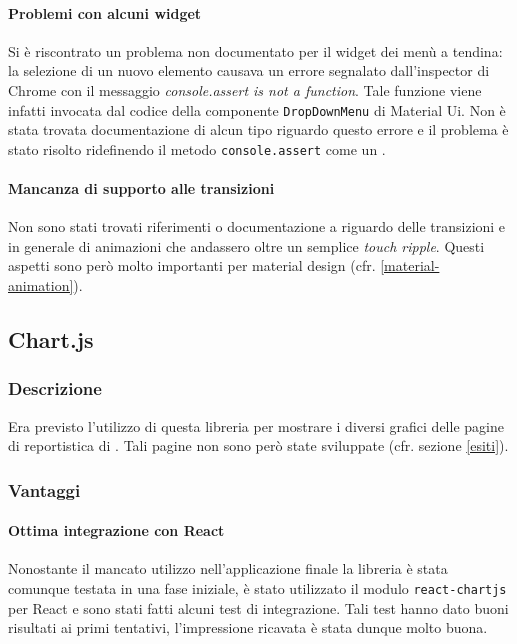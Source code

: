 \paragraph{Problemi con alcuni widget}
Si è riscontrato un problema non documentato
per il widget dei menù a tendina: la selezione di un nuovo elemento causava un errore
segnalato dall'inspector di Chrome con il messaggio \textit{console.assert
is not a function}. Tale funzione viene infatti invocata dal codice della componente
\texttt{DropDownMenu} di Material Ui. Non è stata trovata documentazione di alcun tipo
riguardo questo errore e il problema è stato risolto ridefinendo il metodo
\texttt{console.assert} come un .

\paragraph{Mancanza di supporto alle transizioni}
Non sono stati trovati riferimenti
o documentazione a riguardo delle transizioni e in generale di animazioni che andassero
oltre un semplice \textit{touch ripple}. Questi aspetti sono però molto importanti per
material design (cfr. \ref{material-animation}).

\subsection{Chart.js}

\subsubsection{Descrizione}
Era previsto l'utilizzo di questa libreria per mostrare i diversi grafici delle pagine
di reportistica di \fiscoloMobile{}. Tali pagine non sono però state sviluppate (cfr.
sezione \ref{esiti}).

\subsubsection{Vantaggi}

\paragraph{Ottima integrazione con React}
Nonostante il mancato utilizzo nell'applicazione finale la libreria è stata comunque
testata in una fase iniziale, è stato utilizzato il modulo \texttt{react-chartjs} per
React e sono stati fatti alcuni test di integrazione. Tali test hanno dato buoni
risultati ai primi tentativi, l'impressione ricavata è stata dunque molto buona.

